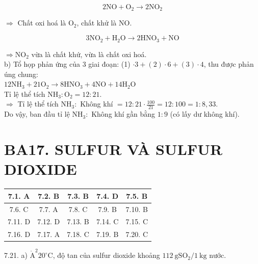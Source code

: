 \documentclass[10pt]{article}
\def\AA{\mathring{\mathrm{A}}}
\begin{document}
\begin{equation*}
2 \mathrm{NO}+\mathrm{O}_{2} \longrightarrow 2 \mathrm{NO}_{2} \tag{2}
\end{equation*}


$\Rightarrow$ Chất oxi hoá là $\mathrm{O}_{2}$, chất khử là NO.


\begin{equation*}
3 \mathrm{NO}_{2}+\mathrm{H}_{2} \mathrm{O} \longrightarrow 2 \mathrm{HNO}_{3}+\mathrm{NO} \tag{3}
\end{equation*}


$\Rightarrow \mathrm{NO}_{2}$ vừa là chất khứ, vừa là chất oxi hoá.\\
b) Tổ họp phản ứng của 3 giai đoạn: (1) $\cdot 3+(2) \cdot 6+(3) \cdot 4$, thu được phản úng chung:\\
$12 \mathrm{NH}_{3}+21 \mathrm{O}_{2} \longrightarrow 8 \mathrm{HNO}_{3}+4 \mathrm{NO}+14 \mathrm{H}_{2} \mathrm{O}$\\
Tỉ lệ thể tích $\mathrm{NH}_{3}: \mathrm{O}_{2}=12: 21$.\\
$\Rightarrow$ Tỉ lệ thể tích $\mathrm{NH}_{3}:$ Không khí $=12: 21 \cdot \frac{100}{21}=12: 100=1: 8,33$.\\
Do vậy, ban đầu tỉ lệ $\mathrm{NH}_{3}:$ Không khí gần bằng $1: 9$ (có lấy dư không khí).

\section*{BA17. SULFUR VÀ SULFUR DIOXIDE}
\begin{center}
\begin{tabular}{|c|c|c|c|c|}
\hline
7.1. A & 7.2. B & 7.3. B & 7.4. D & 7.5. B \\
\hline
7.6. C & 7.7. A & 7.8. C & 7.9. B & 7.10. B \\
\hline
7.11. D & 7.12. D & 7.13. B & 7.14. C & 7.15. C \\
\hline
7.16. D & 7.17. A & 7.18. C & 7.19. B & 7.20. C \\
\hline
\end{tabular}
\end{center}

7.21. a) $\AA^{2} 20^{\circ} \mathrm{C}$, độ tan của sulfur dioxide khoảng $112 \mathrm{~g} \mathrm{SO}_{2} / 1 \mathrm{~kg}$ nước.
\end{document}
